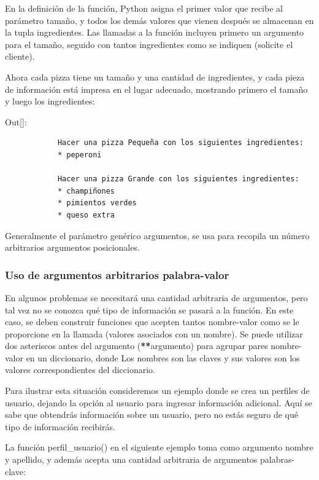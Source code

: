 En la definición de la función, Python asigna el primer valor que recibe al parámetro
tamaño, y todos los demás valores que vienen después se almacenan en la tupla ingredientes. 
Las llamadas a la función incluyen primero un argumento para el tamaño, seguido con tantos ingredientes como se indiquen (solicite el cliente). 

Ahora cada pizza tiene un tamaño y una cantidad de ingredientes, y cada pieza de información está impresa en el lugar adecuado, mostrando primero el tamaño y luego los ingredientes:\vspace{0.08cm}


{\ttfamily\scriptsize\noindent Out[]:\vspace{-0.3cm}	
	{\color{blue} 	
		\begin{verbatim}
			Hacer una pizza Pequeña con los siguientes ingredientes:
			* peperoni
			
			Hacer una pizza Grande con los siguientes ingredientes:
			* champiñones
			* pimientos verdes
			* queso extra	
		\end{verbatim}
}}


Generalmente el parámetro genérico {\ttfamily *}argumentos, se usa  para recopila un número arbitrarios argumentos posicionales.

\subsubsection{Uso de argumentos arbitrarios palabra-valor}

En algunos problemas se necesitará una cantidad arbitraria de argumentos, pero tal vez no se conozca qué tipo de información se pasará a la función. En este caso, se deben construir funciones que acepten tantos  nombre-valor como se le proporcione en la llamada (valores asociados con un nombre).
Se puede utilizar dos asteriscos antes del argumento ({\bf{**}}argumento)  para agrupar pares nombre-valor en un diccionario, donde Los nombres  son las claves y sus valores son los valores correspondientes del diccionario.  

Para ilustrar esta situación consideremos un ejemplo donde se  crea un perfiles de usuario, dejando la opción al usuario para ingresar información adicional. Aquí se sabe que obtendrás información sobre un usuario, pero no estás seguro de qué tipo de información recibirás. 

La función {\ttfamily perfil\_usuario()} en el siguiente ejemplo toma como argumento nombre y apellido, y además acepta una cantidad arbitraria de argumentos palabras-clave:

